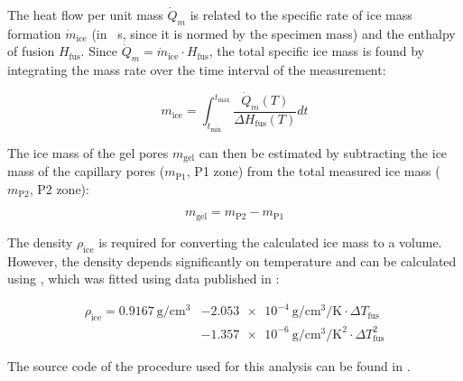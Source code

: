 The heat flow per unit mass $\dot{Q}_{m}$ is related to the specific rate of ice mass formation $\dot{m}_\text{ice}$ (in \unit{\per\second}, since it is normed by the specimen mass) and the enthalpy of fusion $H_\text{fus}$.
Since $\dot{Q}_{m}=\dot{m}_\text{ice}\cdot H_\text{fus}$, the total specific ice mass is found by integrating the mass rate over the time interval of the measurement:

\begin{equation}
	m_\text{ice} = \int_{t_{\text{min}}}^{t_{\text{max}}} \frac{\dot{Q}_{m}(T)}{\Delta H_\text{fus}(T)} dt
	\label{eq:ltdsc_ice_integral}
\end{equation}

The ice mass of the gel pores $m_\text{gel}$ can then be estimated by subtracting the ice mass of the capillary pores ($m_\text{P1}$, P1 zone) from the total measured ice mass ($m_\text{P2}$, P2 zone):

\begin{equation}
	m_\text{gel} = m_\text{P2} - m_\text{P1}
	\label{eq:ltdsc_ice2}
\end{equation}


The density $\rho_\text{ice}$ is required for converting the calculated ice mass to a volume.
However, the density depends significantly on temperature and can be calculated using  \cite{mueller.2021}, which was fitted using data published in \cite{eisenberg.2005}:

\begin{equation}
	\begin{aligned}
		\rho_\text{ice} = \qty{0.9167}{\gram\per\centi\meter\cubed} & - \qty{2.053e-4}{\gram\per\centi\meter\cubed\per\kelvin} \cdot \Delta T_\text{fus}  \\
		& - \qty{1.357e-6}{\gram\per\centi\meter\cubed\per\kelvin\squared} \cdot \Delta T_\text{fus}^2
	\end{aligned}
	\label{eq:ice_density}
\end{equation}

The source code of the procedure used for this analysis can be found in \cite{kleiner.2026f}. %



